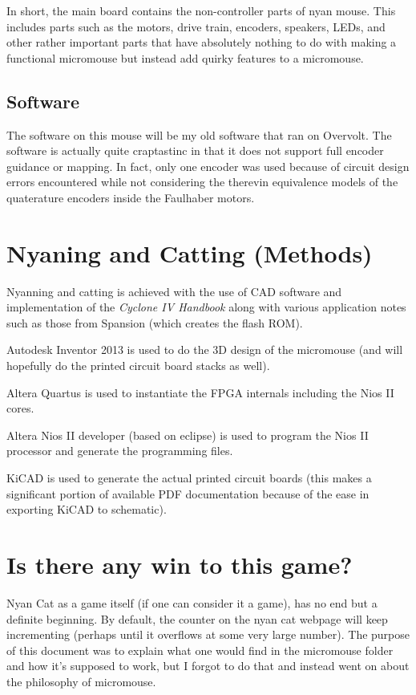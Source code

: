 \documentclass{article}
\begin{document}
In short, the main board contains the non-controller parts of nyan mouse.  This includes parts such as the motors, drive train, encoders, speakers, LEDs, and other rather important parts that have absolutely nothing to do with making a functional micromouse but instead add quirky features to a micromouse.

\subsection {Software}
The software on this mouse will be my old software that ran on Overvolt.
The software is actually quite craptastinc in that it does not support full encoder guidance or mapping.
In fact, only one encoder was used because of circuit design errors encountered while not considering the therevin equivalence models of the quaterature encoders inside the Faulhaber motors.

\section {Nyaning and Catting (Methods)}
Nyanning and catting is achieved with the use of CAD software and implementation of the \textit{Cyclone IV Handbook} along with various application notes such as those from Spansion (which creates the flash ROM).

Autodesk Inventor 2013 is used to do the 3D design of the micromouse (and will hopefully do the printed circuit board stacks as well).

Altera Quartus is used to instantiate the FPGA internals including the Nios II cores.

Altera Nios II developer (based on eclipse) is used to program the Nios II processor and generate the programming files.

KiCAD is used to generate the actual printed circuit boards (this makes a significant portion of available PDF documentation because of the ease in exporting KiCAD to schematic).

\section {Is there any win to this game?}
Nyan Cat as a game itself (if one can consider it a game), has no end but a definite beginning.  By default, the counter on the nyan cat webpage will keep incrementing (perhaps until it overflows at some very large number).  The purpose of this document was to explain what one would find in the micromouse folder and how it's supposed to work, but I forgot to do that and instead went on about the philosophy of micromouse.
\end{document}
